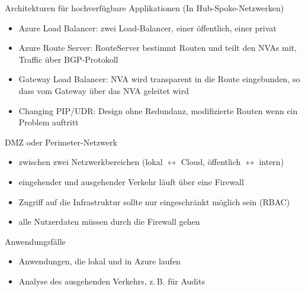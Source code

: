 \begin{flashcard}[]{Architekturen für hochverfügbare Applikationen}
  (In Hub-Spoke-Netzwerken)
  \begin{itemize}
    \item Azure Load Balancer:\newline
      zwei Load-Balancer, einer öffentlich, einer privat
    \item Azure Route Server:\newline
      RouteServer bestimmt Routen und teilt den NVAs mit, Traffic über BGP-Protokoll
    \item Gateway Load Balancer:\newline
      NVA wird transparent in die Route eingebunden, so dass vom Gateway über das NVA geleitet wird
    \item Changing PIP/UDR:\newline
      Design ohne Redundanz, modifizierte Routen wenn ein Problem auftritt
  \end{itemize}
\end{flashcard}

\begin{flashcard}[]{DMZ oder Perimeter-Netzwerk}
  \begin{itemize}
    \item zwischen zwei Netzwerkbereichen (lokal $\leftrightarrow$ Cloud, öffentlich $\leftrightarrow$ intern)
    \item eingehender und ausgehender Verkehr läuft über eine Firewall
    \item Zugriff auf die Infrastruktur sollte nur eingeschränkt möglich sein (RBAC)
    \item alle Nutzerdaten müssen durch die Firewall gehen
  \end{itemize}
\end{flashcard}

\begin{flashcard}[]{Anwendungsfälle}
  \begin{itemize}
    \item Anwendungen, die lokal und in Azure laufen
    \item Analyse des ausgehenden Verkehrs, z.\,B. für Audits
  \end{itemize}
\end{flashcard}

